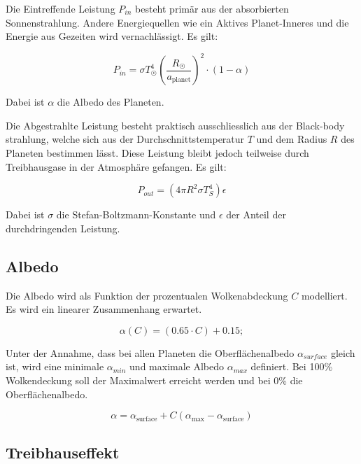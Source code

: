 \begin{refsection}
Die Eintreffende Leistung $P_{in}$ besteht primär aus der absorbierten Sonnenstrahlung. Andere Energiequellen wie ein Aktives Planet-Inneres und die Energie aus Gezeiten wird vernachlässigt. Es gilt:

\begin{equation}
P_{in} = \sigma T_{\astrosun}^4 \left( \frac{R_{\astrosun}}{a_{\text{planet}}} \right) ^2 \cdot (1-\alpha)
\end{equation}

Dabei ist $\alpha$ die Albedo des Planeten.

Die Abgestrahlte Leistung besteht praktisch ausschliesslich aus der Black-body strahlung, welche sich aus der Durchschnittstemperatur $T$ und dem Radius $R$ des Planeten bestimmen lässt. Diese Leistung bleibt jedoch teilweise durch Treibhausgase in der Atmosphäre gefangen. Es gilt: 

\begin{equation}
P_{out} = (4 \pi R^2 \sigma T_{S}^4)\epsilon
\end{equation}

Dabei ist $\sigma$ die Stefan-Boltzmann-Konstante und $\epsilon$ der Anteil der durchdringenden Leistung.

\subsection{Albedo}

Die Albedo wird als Funktion der prozentualen Wolkenabdeckung $C$ modelliert. Es wird ein linearer Zusammenhang erwartet.

\begin{equation}
\alpha(C) = (0.65 \cdot C) + 0.15;
\end{equation}


Unter der Annahme, dass bei allen Planeten die Oberflächenalbedo $\alpha_{surface}$ gleich ist, wird eine minimale $\alpha_{min}$ und maximale Albedo $\alpha_{max}$ definiert. Bei 100\% Wolkendeckung soll der Maximalwert erreicht werden und bei 0\% die Oberflächenalbedo.

\begin{equation}
\alpha = \alpha_{\text{surface}} + C(\alpha_{\text{max}} - \alpha_{\text{surface}})
\end{equation}

\subsection{Treibhauseffekt}


\end{refsection}
